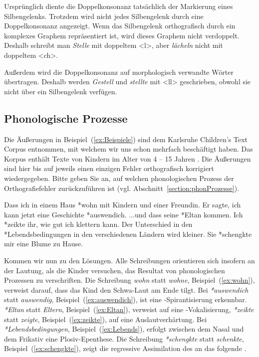 Ursprünglich diente die Doppelkonsonanz tatsächlich der Markierung eines Silbengelenks. Trotzdem wird nicht jedes Silbengelenk durch eine Doppelkonsonanz angezeigt. Wenn das Silbengelenk orthografisch durch ein komplexes Graphem repräsentiert ist, wird dieses Graphem nicht verdoppelt. Deshalb schreibt man \textit{Stelle} mit doppeltem <l>, aber \textit{lächeln} nicht mit doppeltem <ch>. 

Außerdem wird die Doppelkonsonanz auf morphologisch verwandte Wörter übertragen. Deshalb werden \textit{Gestell} und \textit{stellte} mit <ll> geschrieben, obwohl sie nicht über ein Silbengelenk verfügen.

\subsection{Phonologische Prozesse}

Die Äußerungen in Beispiel~(\ref{ex:Beispiele}) sind dem Karlsruhe Children's Text Corpus entnommen, mit welchem wir uns schon mehrfach beschäftigt haben. Das Korpus enthält Texte von Kindern im Alter von 4 -- 15 Jahren \citep[]{KCTC}. Die Äußerungen sind hier bis auf jeweils einen einzigen Fehler orthografisch korrigiert wiedergegeben. Bitte geben Sie an, auf welchen phonologischen Prozess der Orthografiefehler zurückzuführen ist (vgl. Abschnitt~\ref{section:phonProzesse}).

\ea \label{ex:Beispiele}
\ea \label{ex:wohn}Dass ich in einem Haus *wohn mit Kindern und einer Freundin.
\ex \label{ex:auswendich}Er sagte, ich kann jetzt eine Geschichte *auswendich.
\ex \label{ex:Eltan}...und dass seine *Eltan kommen.
\ex \label{ex:zeikte}Ich *zeikte ihr, wie gut ich klettern kann.
\ex \label{ex:Lebends}Der Unterschied in den *Lebendsbedingungen in den verschiedenen Ländern wird kleiner.
\ex \label{ex:schengkte}Sie *schengkte mir eine Blume zu Hause.
\z
\z

Kommen wir nun zu den Lösungen. Alle Schreibungen orientieren sich insofern an der Lautung, als die Kinder versuchen, das Resultat von phonologischen Prozessen zu verschriften. Die Schreibung \textit{wohn} statt \textit{wohne}, Beispiel~(\ref{ex:wohn}), verweist darauf, dass das Kind den Schwa-Laut am Ende tilgt. Bei \textit{*auswendich} statt \textit{auswendig}, Beispiel~(\ref{ex:auswendich}), ist eine -Spirantisierung erkennbar. \textit{*Eltan} statt \textit{Eltern}, Beispiel~(\ref{ex:Eltan}), verweist auf eine -Vokalisierung, \textit{*zeikte} statt \textit{zeigte}, Beispiel~(\ref{ex:zeikte}), auf eine Auslautverhärtung. Bei \textit{*Lebendsbedingungen}, Beispiel~(\ref{ex:Lebends}), erfolgt zwischen dem Nasal und dem Frikativ eine Plosiv-Epenthese. Die Schreibung \textit{*schengkte} statt \textit{schenkte}, Beispiel~(\ref{ex:schengkte}), zeigt die regressive Assimilation des  an das folgende .
